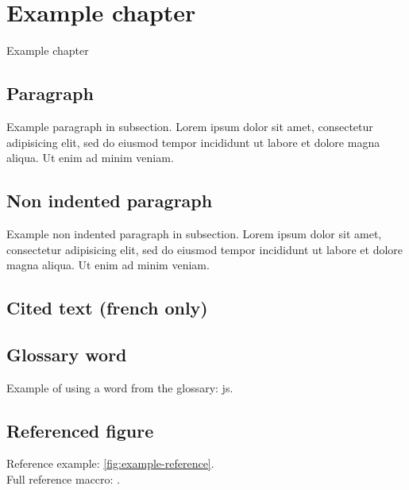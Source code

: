 








\afterpage{\blankpage}

\listoffigures

\tableofcontents


\chapter{Example chapter}
Example chapter

\section{Paragraph}
Example paragraph in subsection. Lorem ipsum dolor sit amet, consectetur adipisicing elit, sed do eiusmod tempor incididunt ut labore et dolore magna aliqua. Ut enim ad minim veniam.

\section{Non indented paragraph}
\noindent
Example non indented paragraph in subsection. Lorem ipsum dolor sit amet, consectetur adipisicing elit, sed do eiusmod tempor incididunt ut labore et dolore magna aliqua. Ut enim ad minim veniam.

\section{Cited text (french only)}
\noindent

\section{Glossary word}
\noindent
Example of using a word from the glossary: \gls{js}.

\section{Referenced figure}
\noindent
Reference example: \ref{fig:example-reference}.\\
Full reference maccro: .

